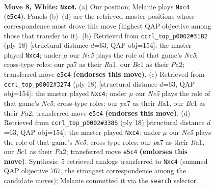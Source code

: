 \documentclass[11pt]{article}
\begin{document}
\begin{figure}[p]\centering
\begin{subfigure}{0.46\textwidth}\centering
\resizebox{\linewidth}{!}{%
\newchessgame
\chessboard[
  setfen={rnbq1rk1/pp2bppp/2p1pn2/4N3/2pP4/6P1/PP2PPBP/RNBQ1RK1 w - - 0 8},
  showmover=false,
  pgfstyle=straightmove, color=movearrow, markmove={e5-c4}
]}
\caption{}
\end{subfigure}\hfill
\begin{subfigure}{0.46\textwidth}\centering
\resizebox{\linewidth}{!}{%
\newchessgame
\chessboard[
  setfen={rn1q1rk1/pb2bppp/1pp1pn2/4N3/2pP1B2/2N3P1/PP2PPBP/R2Q1RK1 w - - 0 10},
  showmover=false,
  pgfstyle=straightmove, color=movearrow, markmove={e5-c4}
]}
\caption{}
\end{subfigure}
\\[4pt]
\begin{subfigure}{0.46\textwidth}\centering
\resizebox{\linewidth}{!}{%
\newchessgame
\chessboard[
  setfen={rn1q1rk1/pb2bppp/1pp1pn2/4N3/2pP1B2/2N3P1/PP2PPBP/R2Q1RK1 w - - 0 10},
  showmover=false,
  pgfstyle=straightmove, color=movearrow, markmove={e5-c4}
]}
\caption{}
\end{subfigure}\hfill
\begin{subfigure}{0.46\textwidth}\centering
\resizebox{\linewidth}{!}{%
\newchessgame
\chessboard[
  setfen={rn1q1rk1/pb2bppp/1pp1pn2/4N3/2pP1B2/2N3P1/PP2PPBP/R2Q1RK1 w - - 0 10},
  showmover=false,
  pgfstyle=straightmove, color=movearrow, markmove={e5-c4}
]}
\caption{}
\end{subfigure}
\caption{\textbf{Move 8, White: \texttt{Nxc4}.} (a) Our position; Melanie plays \texttt{Nxc4} (\texttt{e5c4}). Panels (b)--(d) are the retrieved master positions whose correspondence most drove this move (highest QAP objective among those that transfer to it). (b) Retrieved from \texttt{ccrl\_top\_p0002\#3182} (ply 18) [structural distance $d$=63, QAP obj=154]: the master played \texttt{Nxc4}; under $\mu$ our \emph{Ne5} plays the role of that game's \emph{Ne5}; cross-type roles: our \emph{p}a7 as their \emph{R}a1, our \emph{B}c1 as their \emph{P}a2; transferred move \texttt{e5c4} \textbf{(endorses this move)}. (c) Retrieved from \texttt{ccrl\_top\_p0002\#3274} (ply 18) [structural distance $d$=63, QAP obj=154]: the master played \texttt{Nxc4}; under $\mu$ our \emph{Ne5} plays the role of that game's \emph{Ne5}; cross-type roles: our \emph{p}a7 as their \emph{R}a1, our \emph{B}c1 as their \emph{P}a2; transferred move \texttt{e5c4} \textbf{(endorses this move)}. (d) Retrieved from \texttt{ccrl\_top\_p0002\#3385} (ply 18) [structural distance $d$=63, QAP obj=154]: the master played \texttt{Nxc4}; under $\mu$ our \emph{Ne5} plays the role of that game's \emph{Ne5}; cross-type roles: our \emph{p}a7 as their \emph{R}a1, our \emph{B}c1 as their \emph{P}a2; transferred move \texttt{e5c4} \textbf{(endorses this move)}. Synthesis: 5 retrieved analogs transferred to \texttt{Nxc4} (summed QAP objective 767, the strongest correspondence among the candidate moves); Melanie committed it via the \texttt{search} selector.}
\label{fig:thought-m14}
\end{figure}
\end{document}
